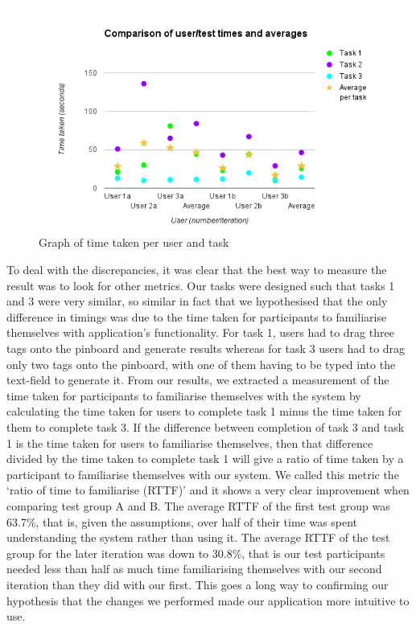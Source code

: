 \documentclass[10pt,a4paper]{article}
\begin{document}
\begin{figure}[H]
	\begin{center}
		\includegraphics[scale=0.5]{graph.png}
		\caption{Graph of time taken per user and task}
		\label{figure:graph}
	\end{center}
\end{figure}

To deal with the discrepancies, it was clear that the best way to measure the result was to look for other metrics. Our tasks were designed such that tasks 1 and 3 were very similar, so similar in fact that we hypothesised that the only difference in timings was due to the time taken for participants to familiarise themselves with application’s functionality. For task 1, users had to drag three tags onto the pinboard and generate results whereas for task 3 users had to drag only two tags onto the pinboard, with one of them having to be typed into the text-field to generate it. From our results, we extracted a measurement of the time taken for participants to familiarise themselves with the system by calculating the time taken for users to complete task 1 minus the time taken for them to complete task 3. If the difference between completion of task 3 and task 1 is the time taken for users to familiarise themselves, then that difference divided by the time taken to complete task 1 will give a ratio of time taken by a participant to familiarise themselves with our system. We called this metric the ‘ratio of time to familiarise (RTTF)’ and it shows a very clear improvement when comparing test group A and B. The average RTTF of the first test group was 63.7\%, that is, given the assumptions, over half of their time was spent understanding the system rather than using it. The average RTTF of the test group for the later iteration was down to 30.8\%, that is our test participants needed less than half as much time familiarising themselves with our second iteration than they did with our first. This goes a long way to confirming our hypothesis that the changes we performed made our application more intuitive to use.
\end{document}

